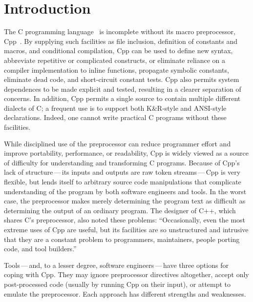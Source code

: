 \documentclass[10pt]{article}
\begin{document}
\bigskip

\section{Introduction}

The C programming language~\cite{ansi} is incomplete without its macro
preprocessor, Cpp~\cite[Ch.~3]{Harbison91}. By supplying such
facilities as file inclusion, definition of constants and macros, and
conditional compilation, Cpp can be used to define new syntax,
abbreviate repetitive or complicated constructs, or eliminate reliance
on a compiler implementation to inline functions, propagate symbolic
constants, eliminate dead code, and short-circuit constant tests.  Cpp
also permits system dependences to be made explicit and tested,
resulting in a clearer separation of concerns.  In addition, Cpp
permits a single source to contain multiple different dialects of C; a
frequent use is to support both K\&R-style and ANSI-style
declarations.  Indeed, one cannot write practical C programs without
these facilities.

While disciplined use of the preprocessor can reduce programmer effort
and improve portability, performance, or readability, Cpp is widely
viewed as a source of difficulty for understanding and transforming C
programs.  Because of Cpp's lack of structure\,---\,its inputs and
outputs are raw token streams\,---\,Cpp is very flexible, but lends
itself to arbitrary source code manipulations that complicate
understanding of the program by both software engineers and tools.  In
the worst case, the preprocessor makes merely determining the program
text as difficult as determining the output of an ordinary program.
The designer of C++, which shares C's preprocessor, also noted these
problems: ``Occasionally, even the most extreme uses of Cpp are
useful, but its facilities are so unstructured and intrusive that they
are a constant problem to programmers, maintainers, people porting
code, and tool builders.''~\cite[p.~424]{Stroustrup-DesignEvolution}

Tools\,---\,and, to a lesser degree, software engineers\,---\,have
three options for coping with Cpp.  They may ignore preprocessor
directives altogether, accept only post-processed code (usually by
running Cpp on their input), or attempt to emulate the preprocessor.
Each approach has different strengths and weaknesses.
\end{document}
